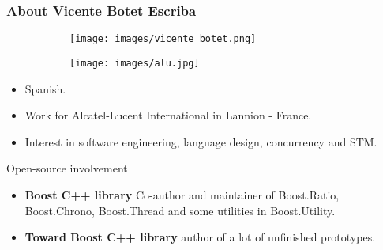 \documentclass[xcolor=dvipsnames]{beamer}
\begin{document}
\begin{frame}
\frametitle{About Vicente Botet Escriba}

\begin{figure}[p]
  \centering
  \begin{subfigure}[b]{0.3\textwidth}
    \texttt{[image: images/vicente\_botet.png]}
  \end{subfigure}
  \qquad \qquad \quad
  \begin{subfigure}[b]{0.3\textwidth}
    \texttt{[image: images/alu.jpg]}
  \end{subfigure}
\end{figure}

\begin{itemize}
\item Spanish.
\item Work for Alcatel-Lucent International in Lannion - France.
\item Interest in software engineering, language design, concurrency and STM.
\end{itemize}

\begin{block}{Open-source involvement}
\begin{itemize}
\item \textbf{Boost C++ library} Co-author and maintainer of Boost.Ratio, Boost.Chrono, Boost.Thread and some utilities in Boost.Utility.
\item \textbf{Toward Boost C++ library} author of a lot of unfinished prototypes.
\end{itemize}
\end{block}
\end{frame}
\end{document}

